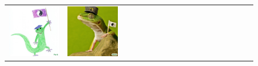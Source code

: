 \begin{figure}[ht!]
\begin{adjustwidth}{-0.8in}{-0.5in}
\begin{tabular}{cccccccccccccccccccc}
\multicolumn{2}{c}{\includegraphics[width=\threebythreecolwidth\textwidth]{figures/cherries/crayon.jpg}} &
\multicolumn{2}{c}{\includegraphics[width=\threebythreecolwidth\textwidth]{figures/cherries/photograph.jpg}} &

\end{tabular}
\end{adjustwidth}
\end{figure}

